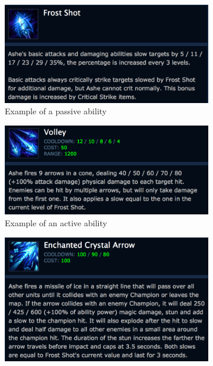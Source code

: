 \begin{figure}[!htb]
  \centering
  \begin{subfigure}[b]{0.49\textwidth}
    \includegraphics[width=\textwidth]{img/frostshot.png}
    \caption{Example of a passive ability}
    \label{fig:frostshot}
  \end{subfigure}
  \begin{subfigure}[b]{0.49\textwidth}
    \includegraphics[width=\textwidth]{img/volley.png}
    \caption{Example of an active ability}
    \label{fig:volley}
  \end{subfigure}
  \begin{subfigure}[b]{0.49\textwidth}
    \includegraphics[width=\textwidth]{img/enchanted.png}

\end{subfigure}
\end{figure}
